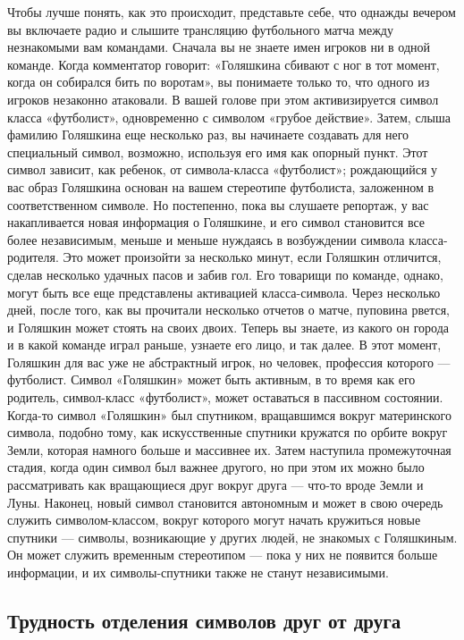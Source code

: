 \documentclass[../main.tex]{subfiles}
\begin{document}
Чтобы лучше понять, как это происходит, представьте себе, что однажды вечером вы включаете радио и слышите трансляцию футбольного матча между незнакомыми вам командами. Сначала вы не знаете имен игроков ни в одной команде. Когда комментатор говорит: «Голяшкина сбивают с ног в тот момент, когда он собирался бить по воротам», вы понимаете только то, что одного из игроков незаконно атаковали. В вашей голове при этом активизируется символ класса «футболист», одновременно с символом «грубое действие». Затем, слыша фамилию Голяшкина еще несколько раз, вы начинаете создавать для него специальный символ, возможно, используя его имя как опорный пункт. Этот символ зависит, как ребенок, от символа-класса «футболист»; рождающийся у вас образ Голяшкина основан на вашем стереотипе футболиста, заложенном в соответственном символе. Но постепенно, пока вы слушаете репортаж, у вас накапливается новая информация о Голяшкине, и его символ становится все более независимым, меньше и меньше нуждаясь в возбуждении символа класса-родителя. Это может произойти за несколько минут, если Голяшкин отличится, сделав несколько удачных пасов и забив гол. Его товарищи по команде, однако, могут быть все еще представлены активацией класса-символа. Через несколько дней, после того, как вы прочитали несколько отчетов о матче, пуповина рвется, и Голяшкин может стоять на своих двоих. Теперь вы знаете, из какого он города и в какой команде играл раньше, узнаете его лицо, и так далее. В этот момент, Голяшкин для вас уже не абстрактный игрок, но человек, профессия которого --- футболист. Символ «Голяшкин» может быть активным, в то время как его родитель, символ-класс «футболист», может оставаться в пассивном состоянии. Когда-то символ «Голяшкин» был спутником, вращавшимся вокруг материнского символа, подобно тому, как искусственные спутники кружатся по орбите вокруг Земли, которая намного больше и массивнее их. Затем наступила промежуточная стадия, когда один символ был важнее другого, но при этом их можно было рассматривать как вращающиеся друг вокруг друга --- что-то вроде Земли и Луны. Наконец, новый символ становится автономным и может в свою очередь служить символом-классом, вокруг которого могут начать кружиться новые спутники --- символы, возникающие у других людей, не знакомых с Голяшкиным. Он может служить временным стереотипом --- пока у них не появится больше информации, и их символы-спутники также не станут независимыми.

\subsection{Трудность отделения символов друг от друга}
\end{document}
